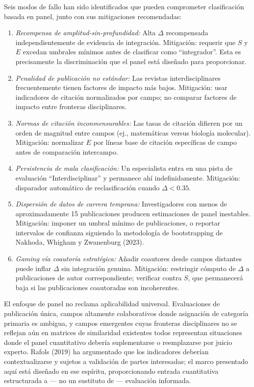 \documentclass[
]{article}
\begin{document}
Seis modos de fallo han sido identificados que pueden comprometer
clasificación basada en panel, junto con sus mitigaciones recomendadas:

\begin{enumerate}
\def\labelenumi{\arabic{enumi}.}
\item
  \emph{Recompensa de amplitud-sin-profundidad:} Alta \(\Delta\)
  recompensada independientemente de evidencia de integración.
  Mitigación: requerir que \(S\) y \(E\) excedan umbrales mínimos antes
  de clasificar como ``integrador''. Esta es precisamente la
  discriminación que el panel está diseñado para proporcionar.
\item
  \emph{Penalidad de publicación no estándar:} Las revistas
  interdisciplinares frecuentemente tienen factores de impacto más
  bajos. Mitigación: usar indicadores de citación normalizados por
  campo; no comparar factores de impacto entre fronteras disciplinares.
\item
  \emph{Normas de citación inconmensurables:} Las tasas de citación
  difieren por un orden de magnitud entre campos (ej., matemáticas
  versus biología molecular). Mitigación: normalizar \(E\) por líneas
  base de citación específicas de campo antes de comparación intercampo.
\item
  \emph{Persistencia de mala clasificación:} Un especialista entra en
  una pista de evaluación ``Interdisciplinar'' y permanece ahí
  indefinidamente. Mitigación: disparador automático de reclasificación
  cuando \(\Delta < 0.35\).
\item
  \emph{Dispersión de datos de carrera temprana:} Investigadores con
  menos de aproximadamente 15 publicaciones producen estimaciones de
  panel inestables. Mitigación: imponer un umbral mínimo de
  publicaciones, o reportar intervalos de confianza siguiendo la
  metodología de bootstrapping de Nakhoda, Whigham y Zwanenburg (2023).
\item
  \emph{Gaming vía coautoría estratégica:} Añadir coautores desde campos
  distantes puede inflar \(\Delta\) sin integración genuina. Mitigación:
  restringir cómputo de \(\Delta\) a publicaciones de autor
  correspondiente; verificar contra \(S\), que permanecerá baja si las
  publicaciones coautoradas son incoherentes.
\end{enumerate}

El enfoque de panel no reclama aplicabilidad universal. Evaluaciones de
publicación única, campos altamente colaborativos donde asignación de
categoría primaria es ambigua, y campos emergentes cuyas fronteras
disciplinares no se reflejan aún en matrices de similaridad existentes
todos representan situaciones donde el panel cuantitativo debería
suplementarse o reemplazarse por juicio experto. Rafols (2019) ha
argumentado que los indicadores deberían contextualizarse y sujetos a
validación de partes interesadas; el marco presentado aquí está diseñado
en ese espíritu, proporcionando entrada cuantitativa estructurada a ---
no un sustituto de --- evaluación informada.
\end{document}
